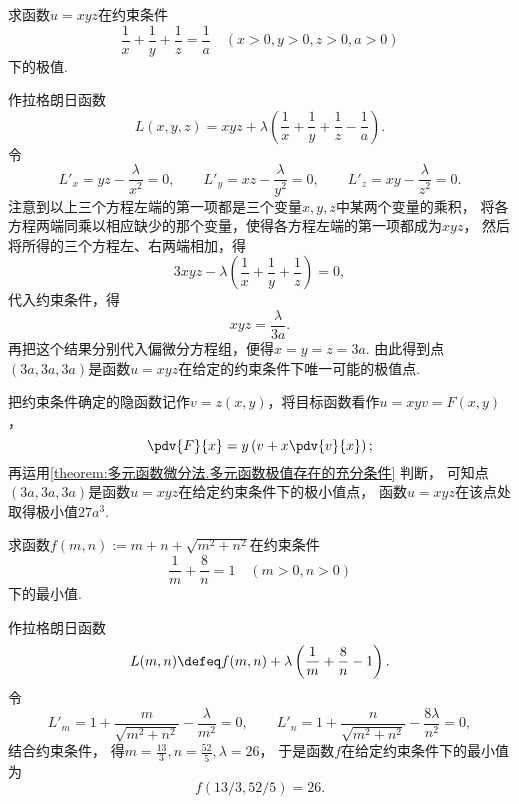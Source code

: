 \begin{example}
求函数\(u=xyz\)在约束条件\begin{equation*}
	\frac{1}{x}+\frac{1}{y}+\frac{1}{z}=\frac{1}{a}
	\quad(x>0,y>0,z>0,a>0)
\end{equation*}下的极值.
\begin{solution}
作拉格朗日函数\begin{equation*}
	L(x,y,z) = xyz+\lambda\left(\frac{1}{x}+\frac{1}{y}+\frac{1}{z}-\frac{1}{a}\right).
\end{equation*}
令\begin{equation*}
	L'_x = yz - \frac{\lambda}{x^2} = 0,
	\qquad
	L'_y = xz - \frac{\lambda}{y^2} = 0,
	\qquad
	L'_z = xy - \frac{\lambda}{z^2} = 0.
\end{equation*}
注意到以上三个方程左端的第一项都是三个变量\(x,y,z\)中某两个变量的乘积，
将各方程两端同乘以相应缺少的那个变量，使得各方程左端的第一项都成为\(xyz\)，
然后将所得的三个方程左、右两端相加，得\begin{equation*}
	3xyz - \lambda\left(\frac{1}{x}+\frac{1}{y}+\frac{1}{z}\right) = 0,
\end{equation*}
代入约束条件，得\begin{equation*}
	xyz = \frac{\lambda}{3a}.
\end{equation*}
再把这个结果分别代入偏微分方程组，便得\(x = y = z = 3a\).
由此得到点\((3a,3a,3a)\)是函数\(u = xyz\)在给定的约束条件下唯一可能的极值点.

把约束条件确定的隐函数记作\(v = z(x,y)\)，将目标函数看作\(u = xyv = F(x,y)\)，\begin{equation*}
	\pdv{F}{x} = y\left(v+x\pdv{v}{x}\right);
\end{equation*}
再运用\cref{theorem:多元函数微分法.多元函数极值存在的充分条件} 判断，
可知点\((3a,3a,3a)\)是函数\(u = xyz\)在给定约束条件下的极小值点，
函数\(u = xyz\)在该点处取得极小值\(27a^3\).
\end{solution}
\end{example}

\begin{example}
求函数\(f(m,n) := m + n + \sqrt{m^2 + n^2}\)在约束条件\begin{equation*}
	\frac1m + \frac8n = 1
	\quad(m>0,n>0)
\end{equation*}
下的最小值.
\begin{solution}
作拉格朗日函数\begin{equation*}
	L(m,n)
	\defeq
	f(m,n) + \lambda \left( \frac1m + \frac8n - 1 \right).
\end{equation*}
令\begin{equation*}
	L'_m
	= 1 + \frac{m}{\sqrt{m^2 + n^2}} - \frac{\lambda}{m^2}
	= 0,
	\qquad
	L'_n
	= 1 + \frac{n}{\sqrt{m^2 + n^2}} - \frac{8\lambda}{n^2}
	= 0,
\end{equation*}
结合约束条件，
得\(
	m = \frac{13}{3},
	n = \frac{52}{5},
	\lambda = 26
\)，
于是函数\(f\)在给定约束条件下的最小值为\begin{equation}
	f(13/3,52/5) = 26.
\end{equation}
\end{solution}
\end{example}

